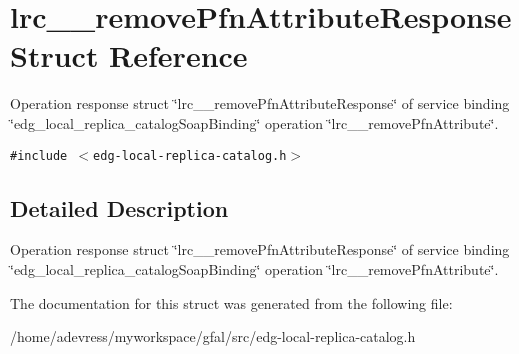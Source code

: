 \section{lrc\_\-\_\-remove\-Pfn\-Attribute\-Response Struct Reference}
\label{structlrc____removePfnAttributeResponse}
Operation response struct \char`\"{}lrc\_\-\_\-remove\-Pfn\-Attribute\-Response\char`\"{} of service binding \char`\"{}edg\_\-local\_\-replica\_\-catalog\-Soap\-Binding\char`\"{} operation \char`\"{}lrc\_\-\_\-remove\-Pfn\-Attribute\char`\"{}.  


{\tt \#include $<$edg-local-replica-catalog.h$>$}



\subsection{Detailed Description}
Operation response struct \char`\"{}lrc\_\-\_\-remove\-Pfn\-Attribute\-Response\char`\"{} of service binding \char`\"{}edg\_\-local\_\-replica\_\-catalog\-Soap\-Binding\char`\"{} operation \char`\"{}lrc\_\-\_\-remove\-Pfn\-Attribute\char`\"{}. 



The documentation for this struct was generated from the following file:\begin{CompactItemize}
\item 
/home/adevress/myworkspace/gfal/src/edg-local-replica-catalog.h\end{CompactItemize}
